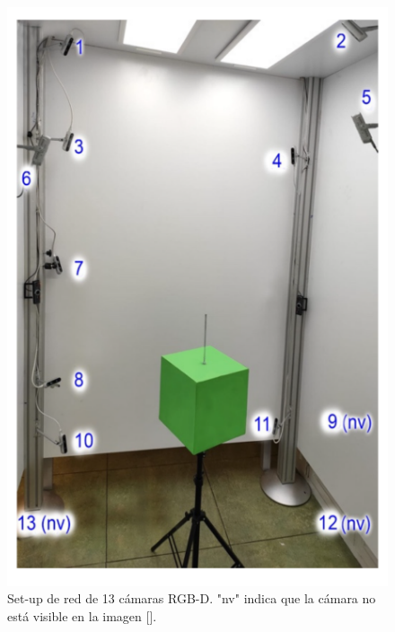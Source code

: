 \begin{figure}[H]
	\centering
	\includegraphics[scale=0.35]{imagenes/estadoarte1.png}
	\caption{Set-up de red de 13 cámaras RGB-D. "nv" indica que la cámara no está visible en la imagen [\cite{Nahuel1}].}
	\label{fig:figura2}
\end{figure}


